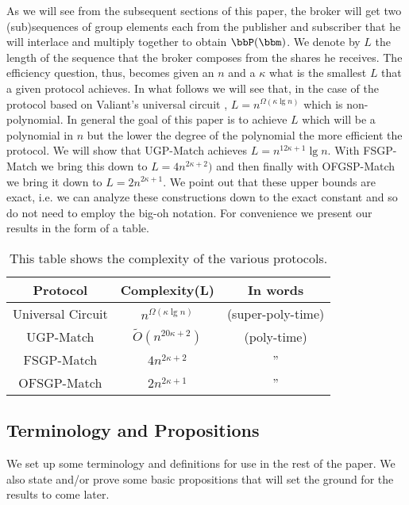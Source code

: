 As we will see from the  subsequent sections of this paper, the broker
will get two (sub)sequences of  group elements each from the publisher
and subscriber that he will  interlace and multiply together to obtain
$\bbP(\bbm)$. We  denote by  $L$ the length  of the sequence  that the
broker composes from the  shares he receives. The efficiency question,
thus, becomes  given an $n$  and a $\kappa$  what is the  smallest $L$
that a given  protocol achieves. In what follows we  will see that, in
the  case  of  the  protocol  based  on  Valiant's  universal  circuit
\cite{V76}, $L = n^{\Omega(\kappa\lg n)}$ which is non-polynomial.  In
general  the goal of  this paper  is to  achieve $L$  which will  be a
polynomial in $n$ but the lower  the degree of the polynomial the more
efficient  the protocol.  We will  show that  UGP-Match achieves  $L =
n^{12\kappa+1}\lg  n$.   With  FSGP-Match   we  bring  this   down  to
$L=4n^{2\kappa+2})$ and then finally with OFGSP-Match we bring it down
to $L=2n^{2\kappa+1}$. We point out that these upper bounds are exact,
i.e. we can analyze these constructions down to the exact constant and
so  do not need  to employ  the big-oh  notation.  For  convenience we
present our results in the form of a table.

\begin{table}[h]
\centering
\begin{tabular}{||c|cc||}
\hline \hline
Protocol & Complexity(L) & In words\\ \hline \hline
Universal Circuit & $n^{\Omega(\kappa\lg n)}$ & (super-poly-time)\\ \hline
UGP-Match & $\tilde{O}(n^{20\kappa+2})$ & (poly-time)\\ \hline
FSGP-Match & $4n^{2\kappa+2}$ & '' \\ \hline
OFSGP-Match & $2n^{2\kappa+1}$ & ''\\
\hline \hline
\end{tabular}
\caption{This table shows the complexity of the various protocols.}
\label{tab:complexity}
\end{table}


\subsection{Terminology and Propositions}
\label{subsec:terminology}
We set up some terminology and  definitions for use in the rest of the
paper. We  also state and/or  prove some basic propositions  that will
set the ground for the results to come later.  

